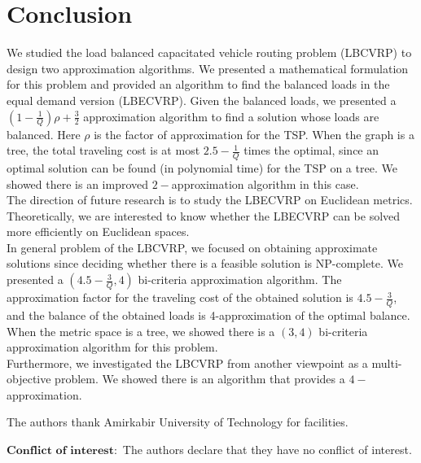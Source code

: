  \section{Conclusion}
\noindent We studied the load balanced capacitated vehicle routing problem (LBCVRP)  to design two approximation algorithms. We presented a mathematical formulation for this problem and provided an algorithm to find the balanced loads in the equal demand version (LBECVRP). Given the balanced loads, we presented a $(1-\frac{1}{Q})\rho+\frac{3}{2}$ approximation algorithm to find a solution whose loads are balanced. Here $\rho$ is the factor of approximation for the TSP. When the graph is a tree, the total traveling cost is at most $2.5-\frac{1}{Q}$ times the optimal, since an optimal solution can be found (in polynomial time) for the TSP on a tree. We showed there is an improved $2-$approximation algorithm in this case. \\
\indent The direction of future research is to study the LBECVRP on Euclidean metrics. Theoretically, we are interested to know whether the LBECVRP can be solved more efficiently on Euclidean spaces. \\
\indent In general problem of the LBCVRP, we focused on obtaining approximate solutions since deciding whether there is a feasible solution is NP-complete. We presented a $(4.5-\frac{3}{Q},4)$ bi-criteria approximation algorithm. The approximation factor for the traveling cost of the obtained solution is $4.5-\frac{3}{Q}$, and the balance of the obtained loads is 4-approximation of the optimal balance. When the metric space is a tree, we showed there is a $(3,4)$ bi-criteria approximation algorithm for this problem.\\
\indent Furthermore, we investigated the LBCVRP from another viewpoint as a multi-objective problem. We showed there is an algorithm that provides a $4-$approximation.
\begin{acknowledgements}
The authors thank Amirkabir University of Technology for facilities.
\end{acknowledgements}
$\mathbf{Conflict\,\,of\,\, interest:}$ The authors declare that they have no conflict of interest.

